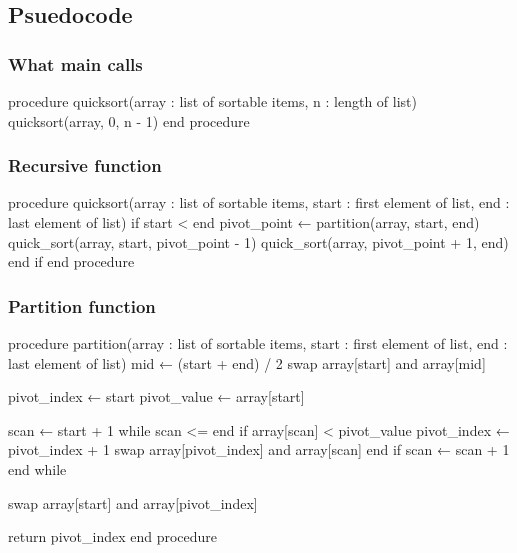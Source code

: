 \documentclass{report}
\begin{document}
    \bigbreak \noindent 
    \subsection{Psuedocode}
    \bigbreak \noindent 

    \subsubsection{What main calls}
    \bigbreak \noindent 
    \begin{cppcode}
    procedure quicksort(array : list of sortable items, n : length of list)
        quicksort(array, 0, n - 1)
    end procedure
    \end{cppcode}

    \pagebreak 
    \subsubsection{Recursive function}
    \bigbreak \noindent 
    \begin{cppcode}
    procedure quicksort(array : list of sortable items, start : first element of list,
    end : last element of list)
        if start < end
            pivot_point ← partition(array, start, end)
            quick_sort(array, start, pivot_point - 1)
            quick_sort(array, pivot_point + 1, end)
        end if
    end procedure
    \end{cppcode}

    \bigbreak \noindent 
    \subsubsection{Partition function}
    \bigbreak \noindent 
    \begin{cppcode}
procedure partition(array : list of sortable items, start : first element of list,
end : last element of list)
    mid ← (start + end) / 2
    swap array[start] and array[mid]

    pivot_index ← start
    pivot_value ← array[start]
    
    scan ← start + 1
    while scan <= end
        if array[scan] < pivot_value
            pivot_index ← pivot_index + 1
            swap array[pivot_index] and array[scan]
        end if
        scan ← scan + 1
    end while

    swap array[start] and array[pivot_index]

    return pivot_index
end procedure
    \end{cppcode}
\end{document}
